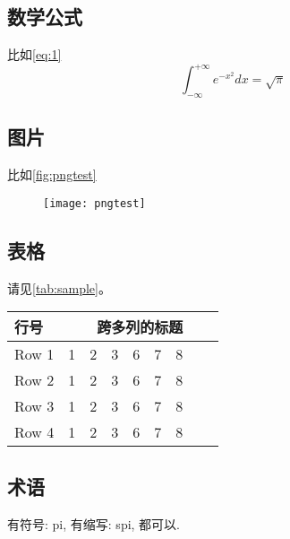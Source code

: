 \subsection{数学公式}

比如\autoref{eq:1}
\begin{equation}
    \label{eq:1}
    \int_{-\infty}^{+\infty} e^{-x^2} dx = \sqrt{\pi}
\end{equation}

\subsection{图片}

比如\autoref{fig:pngtest}
\begin{figure}[htbp]
    \centering
    \texttt{[image: pngtest]}
    \label{fig:pngtest}
\end{figure}

\subsection{表格}

请见\autoref{tab:sample}。
\begin{table}[htbp]
    \label{tab:sample}
    \centering
    \setlength{\tabcolsep}{4pt}%
    \renewcommand{\arraystretch}{1.2}%
    \begin{tabular}{lcccccccc}
        \toprule
        行号 & \multicolumn{8}{c}{跨多列的标题}\\
        \midrule
        Row 1 & 1 & 2 & 3 & 6 & 7 & 8 \\
        Row 2 & 1 & 2 & 3 & 6 & 7 & 8 \\
        Row 3 & 1 & 2 & 3 & 6 & 7 & 8 \\
        Row 4 & 1 & 2 & 3 & 6 & 7 & 8 \\
        \bottomrule
    \end{tabular}
\end{table}

\subsection{术语}

有符号: \gls{pi}, 有缩写: \gls{spi}, 都可以.

